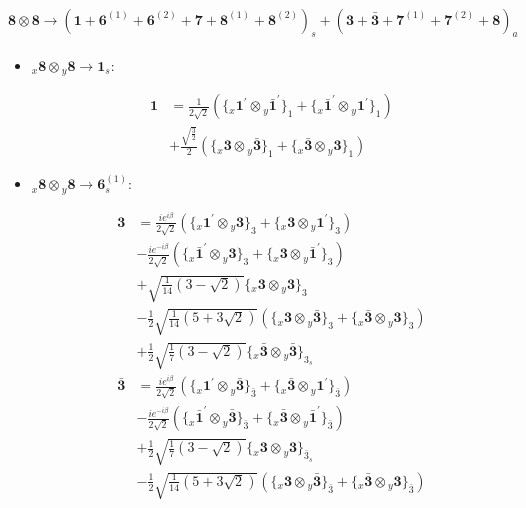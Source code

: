 \documentclass[english]{article}
\newcommand{\cgEqFontsize}{\large}
\newcommand{\rep}[1]{\mathbf{#1}}
\newcommand{\repx}[2]{{}_{#2}\mathbf{#1}}
\newcommand{\tsprod}[2]{\rep{#1}\otimes\rep{#2}}
\newcommand{\tsprodx}[2]{\repx{#1}{x}\otimes\repx{#2}{y}}
\newcommand{\subcgt}[3]{\big\{ \tsprodx{#1}{#2}\big\}^{}_{#3}}
\begin{document}
\paragraph*{\cgEqFontsize $\tsprod{8}{8}\to\left(\rep{1}+\rep{6}^{(1)}+\rep{6}^{(2)}+\rep{7}+\rep{8}^{(1)}+\rep{8}^{(2)}\right)_s+\left(\rep{3}+\rep{\bar{3}}+\rep{7}^{(1)}+\rep{7}^{(2)}+\rep{8}\right)_a$}
\begin{itemize}
\item $\tsprodx{8}{8}\to\rep{1}_{s}$:
\begin{fleqn}
\begin{align*}
\rep{1} & = \frac{1}{2 \sqrt{2}}\left(\subcgt{1^{\prime}}{\bar{1}^{\prime}}{1}+\subcgt{\bar{1}^{\prime}}{1^{\prime}}{1}\right) \\ 
 & +\frac{\sqrt{\frac{3}{2}}}{2}\left(\subcgt{3}{\bar{3}}{1}+\subcgt{\bar{3}}{3}{1}\right)
\end{align*}
\end{fleqn}
\item $\tsprodx{8}{8}\to\rep{6}_{s}^{(1)}$:
\begin{fleqn}
\begin{align*}
\rep{3} & = \frac{i e^{i \beta }}{2 \sqrt{2}}\left(\subcgt{1^{\prime}}{3}{3}+\subcgt{3}{1^{\prime}}{3}\right) \\ 
 & -\frac{i e^{-i \beta }}{2 \sqrt{2}}\left(\subcgt{\bar{1}^{\prime}}{3}{3}+\subcgt{3}{\bar{1}^{\prime}}{3}\right) \\ 
 & +\sqrt{\frac{1}{14} \left(3-\sqrt{2}\right)}\subcgt{3}{3}{3} \\ 
 & -\frac{1}{2} \sqrt{\frac{1}{14} \left(5+3 \sqrt{2}\right)}\left(\subcgt{3}{\bar{3}}{3}+\subcgt{\bar{3}}{3}{3}\right) \\ 
 & +\frac{1}{2} \sqrt{\frac{1}{7} \left(3-\sqrt{2}\right)}\subcgt{\bar{3}}{\bar{3}}{3_{s}}
\end{align*}
\begin{align*}
\rep{\bar{3}} & = \frac{i e^{i \beta }}{2 \sqrt{2}}\left(\subcgt{1^{\prime}}{\bar{3}}{\bar{3}}+\subcgt{\bar{3}}{1^{\prime}}{\bar{3}}\right) \\ 
 & -\frac{i e^{-i \beta }}{2 \sqrt{2}}\left(\subcgt{\bar{1}^{\prime}}{\bar{3}}{\bar{3}}+\subcgt{\bar{3}}{\bar{1}^{\prime}}{\bar{3}}\right) \\ 
 & +\frac{1}{2} \sqrt{\frac{1}{7} \left(3-\sqrt{2}\right)}\subcgt{3}{3}{\bar{3}_{s}} \\ 
 & -\frac{1}{2} \sqrt{\frac{1}{14} \left(5+3 \sqrt{2}\right)}\left(\subcgt{3}{\bar{3}}{\bar{3}}+\subcgt{\bar{3}}{3}{\bar{3}}\right) \\ 

\end{align*}
\end{fleqn}
\end{itemize}
\end{document}
